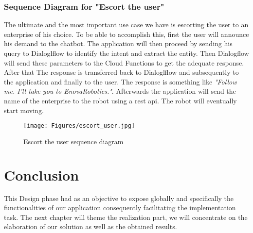 \subsubsection{Sequence Diagram for "Escort the user"}
The ultimate and the most important use case we have is escorting the user to an enterprise of his choice. To be able to accomplish this, first the user will announce his demand to the chatbot. The application will then proceed by sending his query to Dialoglflow to identify the intent and extract the entity. Then Dialogflow will send these parameters to the Cloud Functions to get the adequate response. After that The response is transferred back to Dialoglflow and subsequently to the application and finally to the user. The response is something like \textit{"Follow me. I'll take you to EnovaRobotics."}. Afterwards the application will send the name of the enterprise to the robot using a rest api. The robot will eventually start moving.     
\begin{figure}[H]
\centering
\texttt{[image: Figures/escort\_user.jpg]}
\caption{Escort the user sequence diagram}
\label{fig:seq inquire}
\end{figure}
\section{Conclusion}
This Design phase had as an objective to expose globally and specifically the functionalities of our application consequently facilitating the implementation task. The next chapter will theme the realization part, we will concentrate on the elaboration of our solution as well as the obtained results.  



